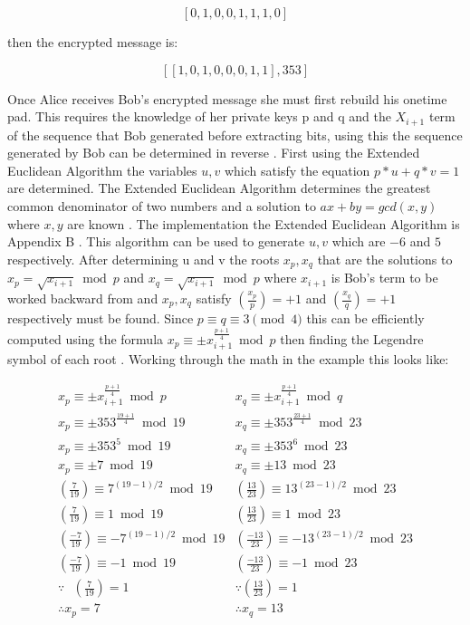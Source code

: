 \documentclass{article}
\begin{document}
$$[0, 1, 0, 0, 1, 1, 1, 0]$$

then the encrypted message is:

$$[[1,0,1,0,0,0,1,1],353]$$

Once Alice receives Bob's encrypted message she must first rebuild his onetime pad. This requires the knowledge of her private keys p and q and the $X_{i+1}$ term of the sequence that Bob generated before extracting bits, using this the sequence generated by Bob can be determined in reverse \cite{Blum1986}. First using the Extended Euclidean Algorithm the variables $u,v$ which satisfy the equation $p*u+q*v=1$ are determined. The Extended Euclidean Algorithm determines the greatest common denominator of two numbers and a solution to $ax+by=gcd(x,y)$ where $x,y$ are known \cite{Silverman2006}. The implementation the Extended Euclidean Algorithm is Appendix B \cite{Brilliant2020}. This algorithm can be used to generate $u,v$ which are $-6$ and $5$ respectively. After determining u and v the roots $x_p, x_q$ that are the solutions to $x_p = \sqrt{x_{i+1}} \bmod p$ and $x_q = \sqrt{x_{i+1}} \bmod p$ where $x_{i+1}$ is Bob's term to be worked backward from and $x_p, x_q$ satisfy $\left(\frac{x_p}{p}\right) = +1$ and $\left(\frac{x_q}{q}\right) = +1$ respectively must be found. Since $p \equiv q \equiv 3 \pmod{4}$ this can be efficiently computed using the formula $x_p \equiv \pm x_{i+1}^{\frac{p+1}{4}} \bmod p$ then finding the Legendre symbol of each root \cite{Faisal2017}. Working through the math in the example this looks like:

$$
\begin{array}{ll}
x_p \equiv \pm x_{i+1}^{\frac{p+1}{4}} \bmod p & x_q \equiv \pm x_{i+1}^{\frac{p+1}{4}} \bmod q \\
x_p \equiv \pm 353^{\frac{19+1}{4}} \bmod 19 & x_q \equiv \pm 353^{\frac{23+1}{4}} \bmod 23 \\
x_p \equiv \pm 353^{5} \bmod 19 & x_q \equiv \pm 353^{6} \bmod 23 \\
x_p \equiv \pm 7 \bmod 19 & x_q \equiv \pm 13 \bmod 23 \\
\left(\frac{7}{19}\right) \equiv 7^{(19-1)/2} \bmod 19 & \left(\frac{13}{23}\right) \equiv 13^{(23-1)/2} \bmod 23 \\
\left(\frac{7}{19}\right) \equiv 1 \bmod 19 & \left(\frac{13}{23}\right) \equiv 1 \bmod 23 \\
\left(\frac{-7}{19}\right) \equiv -7^{(19-1)/2} \bmod 19 & \left(\frac{-13}{23}\right) \equiv -13^{(23-1)/2} \bmod 23 \\
\left(\frac{-7}{19}\right) \equiv -1 \bmod 19 & \left(\frac{-13}{23}\right) \equiv -1 \bmod 23 \\
\because \mbox{ } \left(\frac{7}{19} \right) = 1 & \because \left(\frac{13}{23}\right) = 1 \\
\therefore x_p = 7 & \therefore x_q = 13
\end{array}
$$
\end{document}

